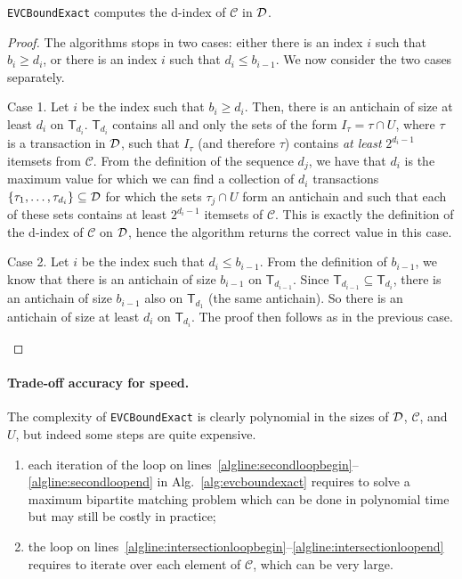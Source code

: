 \begin{lemma}\label{lem:evcboundexactcorrect}
	\texttt{EVCBoundExact} computes the d-index of $\mathcal{C}$ in ${\cal D}$.
\end{lemma}
\begin{proof}
	The algorithms stops in two cases: either there is an index $i$ such that
	$b_i\ge d_i$, or there is an index $i$ such that $d_i\le b_{i-1}$. We now
	consider the two cases separately.

	\begin{description}
		\item{Case 1.} Let $i$ be the index such that $b_i\ge d_i$. Then, there
			is an antichain of size at least $d_i$ on $\mathsf{T}_{d_i}$.
			$\mathsf{T}_{d_i}$ contains all and only the sets of the form
			$I_\tau=\tau\cap U$, where $\tau$ is a transaction in ${\cal D}$, such
			that $I_\tau$ (and therefore $\tau$) contains \emph{at least}
			$2^{d_i-1}$ itemsets from $\mathcal{C}$. From the definition of the
			sequence $d_j$, we have that $d_i$ is the maximum value for which we
			can find a collection of $d_i$ transactions
			$\{\tau_1,\dotsc,\tau_{d_i}\}\subseteq{\cal D}$ for which the sets
			$\tau_j\cap U$ form an antichain and such that each of these sets
			contains at least $2^{d_i-1}$ itemsets of $\mathcal{C}$. This is
			exactly the definition of the d-index of $\mathcal{C}$ on ${\cal D}$,
			hence the algorithm returns the correct value in this case.
		\item{Case 2.} Let $i$ be the index such that $d_i\le b_{i-1}$. From the
			definition of $b_{i-1}$, we know that there is an antichain of size
			$b_{i-1}$ on $\mathsf{T}_{d_{i-1}}$. Since
			$\mathsf{T}_{d_{i-1}}\subseteq \mathsf{T}_{d_i}$, there is an
			antichain of size $b_{i-1}$ also on $\mathsf{T}_{d_1}$ (the same
			antichain). So there is an antichain of size at least $d_i$ on
			$\mathsf{T}_{d_i}$. The proof then follows as in the previous case.
	\end{description}
\end{proof}

\paragraph{Trade-off accuracy for speed.} The complexity of
\texttt{EVCBoundExact} is clearly polynomial in the sizes of ${\cal D}$,
$\mathcal{C}$, and $U$, but indeed some steps are quite expensive. 
\begin{enumerate}
	\item each iteration of the loop on
		lines~\ref{algline:secondloopbegin}--\ref{algline:secondloopend} in
		Alg.~\ref{alg:evcboundexact} requires to solve a maximum bipartite
		matching problem which can be done in polynomial time but may still be
		costly in practice;
	\item the loop on
		lines~\ref{algline:intersectionloopbegin}--\ref{algline:intersectionloopend}
		requires to iterate over each element of $\mathcal{C}$, which can be
		very large.
\end{enumerate}

